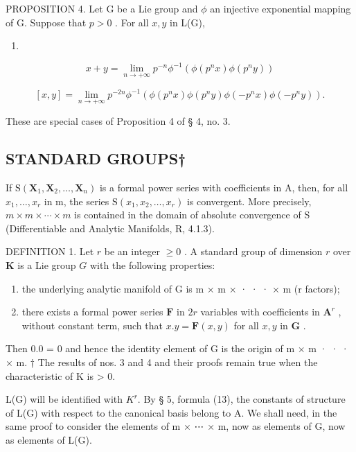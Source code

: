 PROPOSITION 4. Let G be a Lie group and \(\phi\) an injective exponential mapping of G. Suppose that \(p > 0\) . For all \(x, y\) in L(G),

\begin{enumerate}
\def\labelenumi{(\arabic{enumi})}
\tightlist
\item
\end{enumerate}

\[
x + y = \lim _ {n \rightarrow + \infty} p ^ {- n} \phi^ {- 1} (\phi (p ^ {n} x) \phi (p ^ {n} y))\tag{1}
\]

\[
[ x, y ] = \lim _ {n \rightarrow + \infty} p ^ {- 2 n} \phi^ {- 1} (\phi (p ^ {n} x) \phi (p ^ {n} y) \phi (- p ^ {n} x) \phi (- p ^ {n} y)).\tag{2}
\]

These are special cases of Proposition 4 of § 4, no. 3.

\subsection{STANDARD GROUPS†}

If \(\mathrm{S}(\mathbf{X}_{1},\mathbf{X}_{2},\ldots,\mathbf{X}_{n})\) is a formal power series with coefficients in A, then, for all \(x_{1},\ldots,x_{r}\) in m, the series \(\mathrm{S}(x_{1},x_{2},\ldots,x_{r})\) is convergent. More precisely, \(m\times m\times\cdots\times m\) is contained in the domain of absolute convergence of S (Differentiable and Analytic Manifolds, R, 4.1.3).

DEFINITION 1. Let \(r\) be an integer \(\geqslant 0\) . A standard group of dimension \(r\) over \(\mathbf{K}\) is a Lie group \(G\) with the following properties:

\begin{enumerate}
\def\labelenumi{(\roman{enumi})}
\item
  the underlying analytic manifold of G is m × m × · · · × m (r factors);
\item
  there exists a formal power series \(\mathbf{F}\) in \(2r\) variables with coefficients in \(\mathbf{A}^r\) , without constant term, such that \(x.y = \mathbf{F}(x,y)\) for all \(x,y\) in \(\mathbf{G}\) .
\end{enumerate}

Then 0.0 = 0 and hence the identity element of G is the origin of m × m · · · × m.
† The results of nos. 3 and 4 and their proofs remain true when the characteristic of K is > 0.

L(G) will be identified with \(K^r\). By § 5, formula (13), the constants of structure of L(G) with respect to the canonical basis belong to A. We shall need, in the same proof to consider the elements of m × ⋯ × m, now as elements of G, now as elements of L(G).

